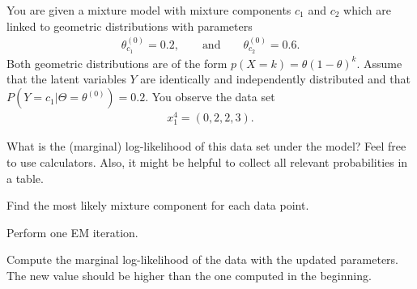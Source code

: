 \documentclass[10pt, a5paper]{scrartcl}
\begin{document}
\boardquestions


\begin{exercise}[Geometric EM]
  You are given a mixture model with mixture components $ c_{1}$ and $c_{2} $ which are linked to geometric
  distributions with parameters 
  \begin{align}
    \theta^{(0)}_{c_{1}} = 0.2, 
    \qquad \text{and} \qquad
    \theta^{(0)}_{c_{2}} = 0.6.
  \end{align}
  Both geometric distributions are of the form $p(X = k) = \theta (1-\theta)^k$.
  Assume that the latent variables $Y$ are identically and independently distributed and that $ P(Y=c_{1}|\Theta=\theta^{(0)}) = 0.2$.
  You observe the data set
  \begin{align*}
  x_1^4 = (0, 2, 2, 3).
  \end{align*}
  
  
  \begin{subex}
  What is the (marginal) log-likelihood of this data set under the model? Feel free to use
  calculators. Also, it might be helpful to collect all relevant probabilities in a table.
  \end{subex}
  
  \begin{subex} 
  Find the most likely mixture component for each data point.
  \end{subex}
  
  \begin{subex}
    Perform one EM iteration.    
  \end{subex}
  
  \begin{subex}
    Compute the marginal log-likelihood of the data with the updated parameters. The new value
  should be higher than the one computed in the beginning.
    
  \end{subex}
\end{exercise}
\end{document}
